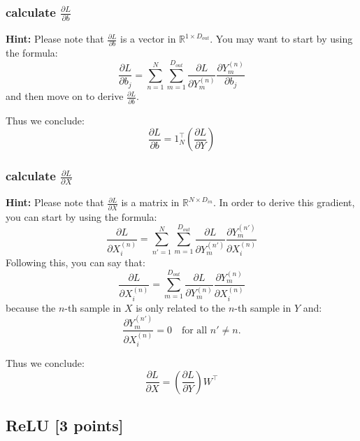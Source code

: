 \documentclass[lang=cn,11pt]{elegantbook}
\begin{document}
\subsubsection*{calculate $\frac{\partial L}{\partial b}$}
\textbf{Hint:} Please note that \( \frac{\partial L}{\partial b} \) is a vector in \( \mathbb{R}^{1 \times D_{out}} \). You may want to start by using the formula:\[
\frac{\partial L}{\partial b_j} = \sum_{n=1}^{N} \sum_{m=1}^{D_{out}} \frac{\partial L}{\partial Y_m^{(n)}} \frac{\partial Y_m^{(n)}}{\partial b_j}
\]and then move on to derive \( \frac{\partial L}{\partial b} \).
\begin{solution}
Thus we conclude: \[
    \frac{\partial L}{\partial b} = 1_N^\top (\frac{\partial L}{\partial Y})
    \]
\end{solution}


\subsubsection*{calculate $\frac{\partial L}{\partial X}$}
\textbf{Hint:} Please note that \( \frac{\partial L}{\partial X} \) is a matrix in \( \mathbb{R}^{N \times D_{in}} \). In order to derive this gradient, you can start by using the formula: \[
\frac{\partial L}{\partial X_i^{(n)}} = \sum_{n'=1}^{N} \sum_{m=1}^{D_{out}} \frac{\partial L}{\partial Y_m^{(n')}} \frac{\partial Y_m^{(n')}}{\partial X_i^{(n)}}
\]
Following this, you can say that: \[
\frac{\partial L}{\partial X_i^{(n)}} = \sum_{m=1}^{D_{out}} \frac{\partial L}{\partial Y_m^{(n)}} \frac{\partial Y_m^{(n)}}{\partial X_i^{(n)}}
\]
because the \( n \)-th sample in \( X \) is only related to the \( n \)-th sample in \( Y \) and: \[
\frac{\partial Y_m^{(n')}}{\partial X_i^{(n)}} = 0 \quad \text{for all } n' \neq n.
\]
\begin{solution}
     Thus we conclude: \[
    \frac{\partial L}{\partial X} =  (\frac{\partial L} {\partial Y}) W^\top
    \]
\end{solution}

\subsection{ReLU [3 points]}
\end{document}
